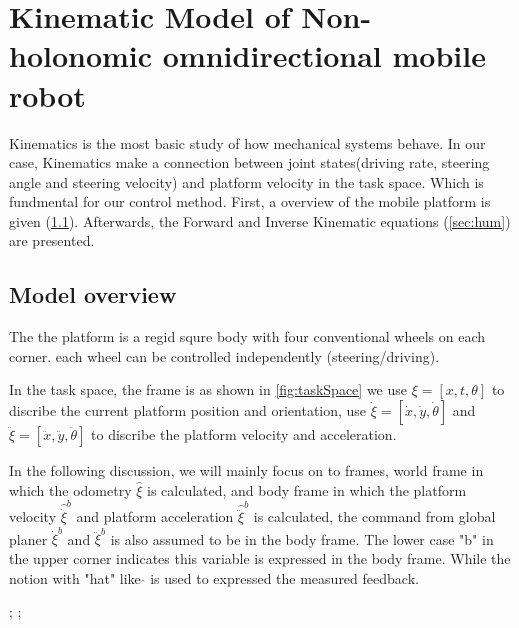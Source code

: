 \chapter{Kinematic Model of Non-holonomic omnidirectional mobile robot}
\label{cha:Kinematic}

Kinematics is the most basic study of how mechanical systems behave. In our case, Kinematics make a connection between joint states(driving rate, steering angle and steering velocity) and platform velocity in the 
task space. Which is fundmental for our control method.
First, a overview of the mobile platform is given (\cref{sec:model_overview}).
Afterwards, the Forward and Inverse Kinematic equations (\cref{sec:hum}) are presented.

\section{Model overview}
\label{sec:model_overview}

The the platform is a regid squre body with four conventional wheels on each corner. each wheel can be controlled independently (steering/driving).

In the task space, the frame is as shown in \cref{fig:taskSpace} we use $ \xi = [x,t,\theta]$ to discribe the current platform position and orientation, use $ \dot{\xi} = [\dot{x},\dot{y},\dot{\theta}] $ and 
$ \ddot{\xi}= [\ddot{x},\ddot{y},\ddot{\theta}] $ to discribe the platform velocity and acceleration. 

In the following discussion, we will mainly focus on to frames, world frame in which the odometry $ \hat{\xi} $ is calculated, and body frame in which the platform velocity $\hat{\dot{\xi}}^b$ and platform 
acceleration $ \hat{\ddot{\xi}}^b $ is calculated, the command from global planer $ \dot{\xi}^b $ and $ \ddot{\xi}^b $ is also assumed to be in the body frame. The lower case "b" in the upper corner indicates 
this variable is expressed in the body frame. While the notion with "hat" like $\hat{}$ is used to expressed the measured feedback.

;
;

